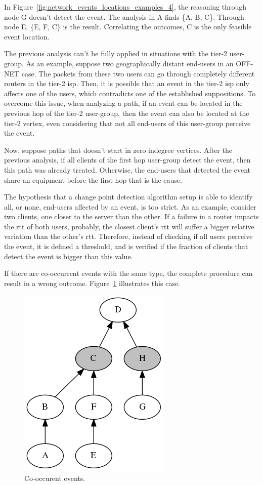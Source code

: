 In Figure~\ref{fig:network_events_locations_examples_4}, the reasoning through
node G doesn't detect the event. The analysis in A finds \{A, B, C\}. Through
node E, \{E, F, C\} is the result.
Correlating the outcomes, C is the only feasible event location.

The previous analysis can't be fully applied in situations with the tier-2
user-group.
As an example, suppose two geographically distant end-users in an OFF-NET case.
The packets from these two users can go through completely different routers in
the tier-2 \gls*{isp}. Then, it is possible that an event in the tier-2 \gls*{isp} only
affects one of the users, which contradicts one of the established suppositions.
To overcome this issue, when analyzing a path, if an event can be located in the
previous hop of the tier-2 user-group, then the event can also be located at
the tier-2 vertex, even considering that not all end-users of this user-group
perceive the event.

Now, suppose paths that doesn't start in zero indegree vertices.
After the previous analysis,
if all clients of the first hop user-group detect the event, then this
path was already treated. Otherwise, the end-users that detected the event
share an equipment before the first hop that is the cause.

The hypothesis that a change point detection algorithm setup is able to
identify all, or none, end-users affected by an event, is too strict.
As an example, consider two clients, one closer to the server than the
other.
If a failure in a router impacts the \gls*{rtt} of both users, probably,
the closest client's \gls*{rtt} will suffer a bigger relative variation than the
other's \gls*{rtt}\@.
Therefore, instead of checking if all users perceive the event,
it is defined a threshold, and is verified if the fraction of clients
that detect the event is bigger than this value.

If there are co-occurrent events with the same type, the complete procedure can
result in a wrong outcome. Figure~\ref{fig:network_events_locations_examples_5}
illustrates this case.

\begin{figure}[H]
    \centering
    \includegraphics[width=0.35\linewidth]{./figures/methodology/spatial_time_correlation/event_tree_graph_5.png}
    \caption{Co-occurent events.}
\label{fig:network_events_locations_examples_5}
\end{figure}%

